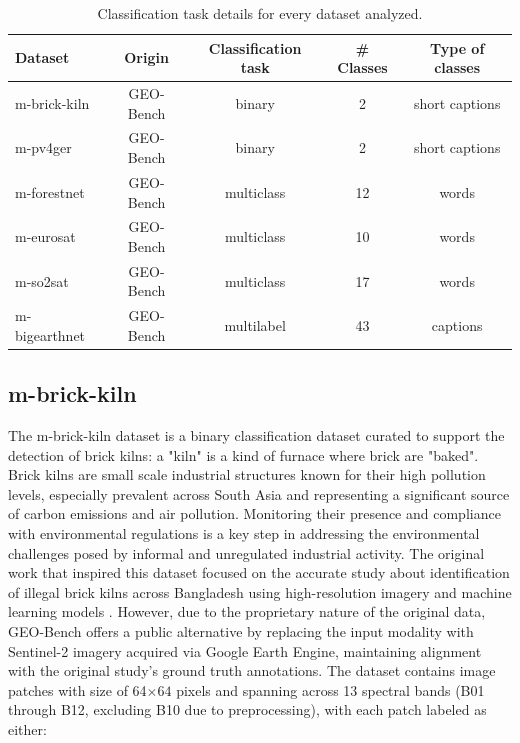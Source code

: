 \documentclass[a4paper, oneside, english]{sapthesis} %
\begin{document}
\begin{table}[ht]
\centering
\footnotesize
\renewcommand{\arraystretch}{1.2}
    \begin{tabular}{lcccc}
    \toprule
    \textbf{Dataset} & \textbf{Origin} & \textbf{Classification task} & \textbf{\# Classes} & \textbf{Type of classes}  \\
    \midrule
    m-brick-kiln & GEO-Bench & binary & 2 & short captions \\
    m-pv4ger & GEO-Bench & binary & 2 & short captions \\
    m-forestnet & GEO-Bench & multiclass & 12 & words \\
    m-eurosat & GEO-Bench & multiclass & 10 & words \\
    m-so2sat & GEO-Bench & multiclass & 17 & words \\
    m-bigearthnet & GEO-Bench & multilabel & 43 & captions \\
    \bottomrule
    \end{tabular}
\vspace{0.3cm}
\caption{\normalsize Classification task details for every dataset analyzed.}
\label{tab:geoclasstypes}
\end{table}

\subsection{m-brick-kiln}

The m-brick-kiln dataset is a binary classification dataset curated to support the detection of brick kilns: a "kiln" is a kind of furnace where brick are "baked". Brick kilns are small scale industrial structures known for their high pollution levels, especially prevalent across South Asia and representing a significant source of carbon emissions and air pollution. Monitoring their presence and compliance with environmental regulations is a key step in addressing the environmental challenges posed by informal and unregulated industrial activity.
The original work that inspired this dataset focused on the accurate study about identification of illegal brick kilns across Bangladesh using high-resolution imagery and machine learning models \cite{lee2021scalable}. However, due to the proprietary nature of the original data, GEO-Bench offers a public alternative by replacing the input modality with Sentinel-2 imagery acquired via Google Earth Engine, maintaining alignment with the original study’s ground truth annotations.
The dataset contains image patches with size of 64$\times64$ pixels and spanning across 13 spectral bands (B01 through B12, excluding B10 due to preprocessing), with each patch labeled as either:
\end{document}
